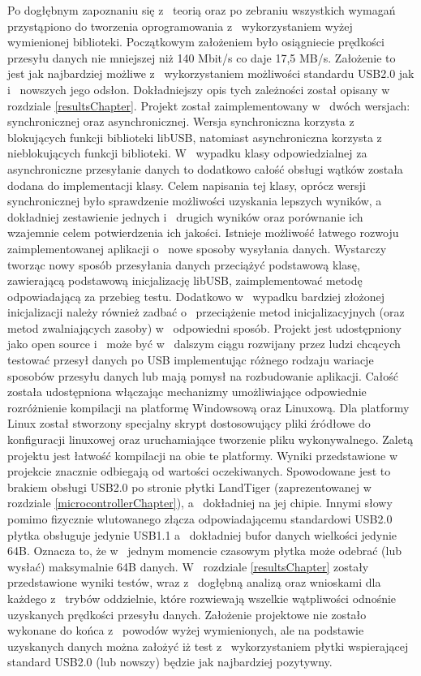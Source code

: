 \documentclass{BscUS}
\begin{document}
\indent Po dogłębnym zapoznaniu się z~ teorią oraz po zebraniu wszystkich wymagań przystąpiono do tworzenia oprogramowania z~ wykorzystaniem wyżej wymienionej biblioteki. Początkowym założeniem było osiągniecie prędkości przesyłu danych nie mniejszej niż 140 Mbit/s co daje 17,5 MB/s. Założenie to jest jak najbardziej możliwe z~ wykorzystaniem możliwości standardu USB2.0 jak i~ nowszych jego odsłon. Dokładniejszy opis tych zależności został opisany w~ rozdziale \ref{resultsChapter}. Projekt został zaimplementowany w~ dwóch wersjach: synchronicznej oraz asynchronicznej. Wersja synchroniczna korzysta z~ blokujących funkcji biblioteki libUSB, natomiast asynchroniczna korzysta z~ nieblokujących funkcji biblioteki. W~ wypadku klasy odpowiedzialnej za asynchroniczne przesyłanie danych to dodatkowo całość obsługi wątków została dodana do implementacji klasy. Celem napisania tej klasy, oprócz wersji synchronicznej było sprawdzenie możliwości uzyskania lepszych wyników, a~ dokładniej zestawienie jednych i~ drugich wyników oraz porównanie ich wzajemnie celem potwierdzenia ich jakości. Istnieje możliwość łatwego rozwoju zaimplementowanej aplikacji o~ nowe sposoby wysyłania danych. Wystarczy tworząc nowy sposób przesyłania danych przeciążyć podstawową klasę, zawierającą podstawową inicjalizację libUSB, zaimplementować metodę odpowiadającą za przebieg testu. Dodatkowo w~ wypadku bardziej złożonej inicjalizacji należy również zadbać o~ przeciążenie metod inicjalizacyjnych (oraz metod zwalniających zasoby) w~ odpowiedni sposób.
\newline
\indent Projekt jest udostępniony jako open source i~ może być w~ dalszym ciągu rozwijany przez ludzi chcących testować przesył danych po USB implementując różnego rodzaju wariacje sposobów przesyłu danych lub mają pomysł na rozbudowanie aplikacji. Całość została udostępniona włączając mechanizmy umożliwiające odpowiednie rozróżnienie kompilacji na platformę Windowsową oraz Linuxową. Dla platformy Linux został stworzony specjalny skrypt dostosowujący pliki źródłowe do konfiguracji linuxowej oraz uruchamiające tworzenie pliku wykonywalnego. Zaletą projektu jest łatwość kompilacji na obie te platformy.
\newline
\indent Wyniki przedstawione w~ projekcie znacznie odbiegają od wartości oczekiwanych. Spowodowane jest to brakiem obsługi USB2.0 po stronie płytki LandTiger (zaprezentowanej w~ rozdziale \ref{microcontrollerChapter}), a~ dokładniej na jej chipie. Innymi słowy pomimo fizycznie wlutowanego złącza odpowiadającemu standardowi USB2.0 płytka obsługuje jedynie USB1.1 a~ dokładniej bufor danych wielkości jedynie 64B. Oznacza to, że w~ jednym momencie czasowym płytka może odebrać (lub wysłać) maksymalnie 64B danych. W~ rozdziale \ref{resultsChapter} zostały przedstawione wyniki testów, wraz z~ dogłębną analizą oraz wnioskami dla każdego z~ trybów oddzielnie, które rozwiewają wszelkie wątpliwości odnośnie uzyskanych prędkości przesyłu danych. Założenie projektowe nie zostało wykonane do końca z~ powodów wyżej wymienionych, ale na podstawie uzyskanych danych można założyć iż test z~ wykorzystaniem płytki wspierającej standard USB2.0 (lub nowszy) będzie jak najbardziej pozytywny.
\end{document}
